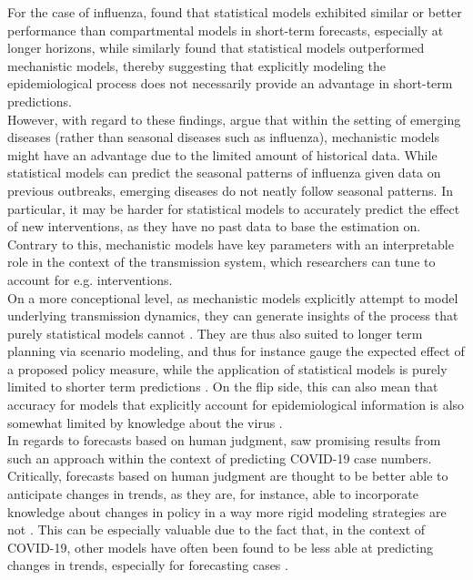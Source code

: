 For the case of influenza, \cite{reich_collaborative_2019} found that statistical models exhibited similar or better performance than compartmental models in short-term forecasts, especially at longer horizons, %
while \cite{mcgowan_collaborative_2019} similarly found that statistical models outperformed mechanistic models, thereby suggesting that explicitly modeling the epidemiological process does not necessarily provide an advantage in short-term predictions. \\
However, with regard to these findings, \cite{bracher_pre-registered_2021} argue that within the setting of emerging diseases (rather than seasonal diseases such as influenza), mechanistic models might have an advantage due to the limited amount of historical data. While statistical models can predict the seasonal patterns of influenza given data on previous outbreaks, emerging diseases do not neatly follow seasonal patterns. In particular, it may be harder for statistical models to accurately predict the effect of new interventions, as they have no past data to base the estimation on. Contrary to this, mechanistic models have key parameters with an interpretable role in the context of the transmission system, which researchers can tune to account for e.g. interventions.\\ 
On a more conceptional level, as mechanistic models explicitly attempt to model underlying transmission dynamics, they can generate insights of the process that purely statistical models cannot \citep{james_use_2021}. They are thus also suited to longer term planning via scenario modeling, and thus for instance gauge the expected effect of a proposed policy measure, while the application of statistical models is purely limited to shorter term predictions \citep{reich_collaborative_2022}. On the flip side, this can also mean that accuracy for models that explicitly account for epidemiological information is also somewhat limited by knowledge about the virus \citep{holmdahl_wrong_2020}. \\
In regards to forecasts based on human judgment, \cite{bosse_comparing_2021-1} saw promising results from such an approach within the context of predicting COVID-19 case numbers. Critically, forecasts based on human judgment are thought to be better able to anticipate changes in trends, as they are, for instance, able to incorporate knowledge about changes in policy in a way more rigid modeling strategies are not \citep{bracher_pre-registered_2021}. This can be especially valuable due to the fact that, in the context of COVID-19, other models have often been found to be less able at predicting changes in trends, especially for forecasting cases \citep{ray_challenges_2021}. \medskip \\
